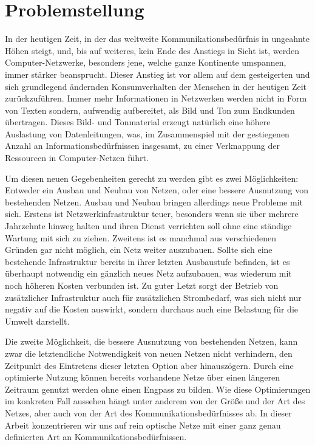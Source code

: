 \chapter{Problemstellung}
In der heutigen Zeit, in der das weltweite Kommunikationsbedürfnis in ungeahnte Höhen steigt, und, bis auf weiteres, kein Ende des Anstiegs in Sicht ist, werden Computer-Netzwerke, besonders jene, welche ganze Kontinente umspannen, immer stärker beansprucht. Dieser Anstieg ist vor allem auf dem gesteigerten und sich grundlegend ändernden Konsumverhalten der Menschen in der heutigen Zeit zurückzuführen. Immer mehr Informationen in Netzwerken werden nicht in Form von Texten sondern, aufwendig aufbereitet, als Bild und Ton zum Endkunden übertragen. Dieses Bild- und Tonmaterial erzeugt natürlich eine höhere Auslastung von Datenleitungen, was, im Zusammenspiel mit der gestiegenen Anzahl an Informationsbedürfnissen insgesamt, zu einer Verknappung der Ressourcen in Computer-Netzen führt.

Um diesen neuen Gegebenheiten gerecht zu werden gibt es zwei Möglichkeiten: Entweder ein Ausbau und Neubau von Netzen, oder eine bessere Ausnutzung von bestehenden Netzen. Ausbau und Neubau bringen allerdings neue Probleme mit sich. Erstens ist Netzwerkinfrastruktur teuer, besonders wenn sie über mehrere Jahrzehnte hinweg halten und ihren Dienst verrichten soll ohne eine ständige Wartung mit sich zu ziehen. Zweitens ist es manchmal aus verschiedenen Gründen gar nicht möglich, ein Netz weiter auszubauen. Sollte sich eine bestehende Infrastruktur bereits in ihrer letzten Ausbaustufe befinden, ist es überhaupt notwendig ein gänzlich neues Netz aufzubauen, was wiederum mit noch höheren Kosten verbunden ist. Zu guter Letzt sorgt der Betrieb von zusätzlicher Infrastruktur auch für zusätzlichen Strombedarf, was sich nicht nur negativ auf die Kosten auswirkt, sondern durchaus auch eine Belastung für die Umwelt darstellt.

Die zweite Möglichkeit, die bessere Ausnutzung von bestehenden Netzen, kann zwar die letzt\-endliche Notwendigkeit von neuen Netzen nicht verhindern, den Zeitpunkt des Eintretens dieser letzten Option aber hinauszögern. Durch eine optimierte Nutzung können bereits vorhandene Netze über einen längeren Zeitraum genutzt werden ohne einen Engpass zu bilden. Wie diese Optimierungen im konkreten Fall aussehen hängt unter anderem von der Größe und der Art des Netzes, aber auch von der Art des Kommunikationsbedürfnisses ab. In dieser Arbeit konzentrieren wir uns auf rein optische Netze mit einer ganz genau definierten Art an Kommunikationsbedürfnissen.

